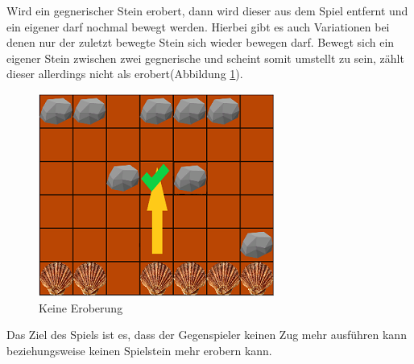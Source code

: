Wird ein gegnerischer Stein erobert, dann wird dieser aus dem Spiel entfernt und ein eigener darf nochmal bewegt werden. Hierbei gibt es auch Variationen bei denen nur der zuletzt bewegte Stein sich wieder bewegen darf.
Bewegt sich ein eigener Stein zwischen zwei gegnerische und scheint somit umstellt zu sein, zählt dieser allerdings nicht als erobert(Abbildung \ref{fig:nichterobern}).
\begin{figure}[h]
	\centering
	\includegraphics{img/regeln_nichterobert2}
	\caption{Keine Eroberung}
	\label{fig:nichterobern}
\end{figure}

Das Ziel des Spiels ist es, dass der Gegenspieler keinen Zug mehr ausführen kann beziehungsweise keinen Spielstein mehr erobern kann.




